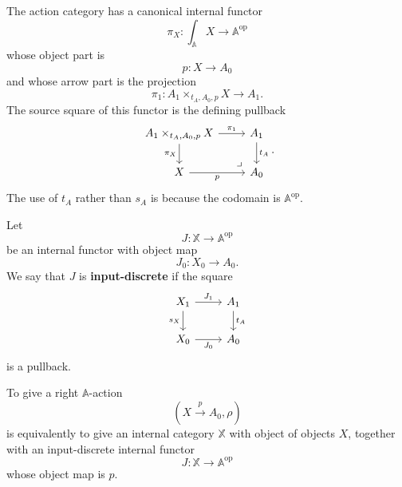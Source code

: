 The action category has a canonical internal functor
\[
\pi_X:\int_{\mathbb A}X\to\mathbb A^{\mathrm{op}}
\]
whose object part is
\[
p:X\to A_0
\]
and whose arrow part is the projection
\[
\pi_1:A_1\times_{t_A,A_0,p}X\to A_1.
\]
The source square of this functor is the defining pullback
\[
\begin{tikzcd}
A_1\times_{t_A,A_0,p}X
\arrow[r,"\pi_1"]
\arrow[d,"\pi_X"']
&
A_1
\arrow[d,"t_A"]
\\
X
\arrow[r,"p"']
&
A_0
\arrow[ul,phantom,very near start,"\lrcorner"]
\end{tikzcd}
.
\]
The use of \(t_A\) rather than \(s_A\) is because the codomain is
\(\mathbb A^{\mathrm{op}}\).

\begin{definition}
\label{def:relative-input-discrete}
Let
\[
J:\mathbb X\to\mathbb A^{\mathrm{op}}
\]
be an internal functor with object map
\[
J_0:X_0\to A_0.
\]
We say that \(J\) is \textbf{input-discrete} if the square
\[
\begin{tikzcd}
X_1 \arrow[r,"J_1"] \arrow[d,"s_X"']
&
A_1 \arrow[d,"t_A"]
\\
X_0 \arrow[r,"J_0"']
&
A_0
\end{tikzcd}
\]
is a pullback.
\end{definition}

\begin{theorem}
\label{thm:relative-actions-input-discrete}
To give a right \(\mathbb A\)-action
\[
(X\xrightarrow{p}A_0,\rho)
\]
is equivalently to give an internal category \(\mathbb X\) with object of
objects \(X\), together with an input-discrete internal functor
\[
J:\mathbb X\to\mathbb A^{\mathrm{op}}
\]
whose object map is \(p\).
\end{theorem}


